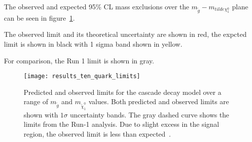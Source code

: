 The observed and expected 95\% CL mass exclusions over the  $m_{\tilde{g}} - m_{tilde{\chi}_1^0}$ plane can be seen in figure~\ref{fig:results_ten_quark_limits}.

The observed limit and its theoretical uncertainty are shown in red, the expcted limit is shown in black with 1 sigma band
shown in yellow.

For comparison, the Run 1 limit is shown in gray.

\begin{figure}[!ht]
    \centering
    \texttt{[image: results\_ten\_quark\_limits]}
    \caption{Predicted and observed limits for the cascade decay model over a range of $m_{\tilde{g}}$ and $m_{\tilde{\chi}_1^0}$ values.
    Both predicted and observed limits are shown with $1\sigma$ uncertainty bands.
    The gray dashed curve shows the limits from the Run-1 analysis.
    Due to slight excess in the signal region, the observed limit is less than expected~\cite{paper-plb}.}
\label{fig:results_ten_quark_limits}
\end{figure}

